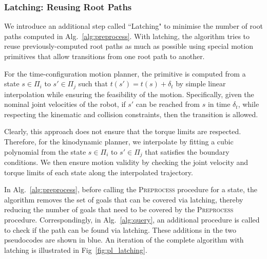 \documentclass[a4paper]{report}
\begin{document}
%

\subsubsection{Latching: Reusing Root Paths}
\label{latching}
We introduce an additional step called ``Latching" to minimise the number of root paths computed in Alg.~\ref{alg:preprocess}. With latching, the algorithm tries to reuse previously-computed root paths as much as possible using special motion primitives that allow transitions from one root path to another.

For the time-configuration motion planner, the primitive is computed from a state $s \in \Pi_i$ to $s' \in \Pi_j$ such that $t(s') = t(s) + \delta_t$ by simple linear interpolation while ensuring the feasibility of the motion. Specifically, given the nominal joint velocities of the robot, if $s'$ can be reached from $s$ in time $\delta_t$, while respecting the kinematic and collision constraints, then the transition is allowed.

Clearly, this approach does not ensure that the torque limits are respected. Therefore, for the kinodynamic planner, we interpolate by fitting a cubic polynomial from the state $s \in \Pi_i$ to $s' \in \Pi_j$ that satisfies the boundary conditions. We then ensure motion validity by checking the joint velocity and torque limits of each state along the interpolated trajectory.

In Alg.~\ref{alg:preprocess}, before calling the \textsc{Preprocess} procedure for a state, the algorithm removes the set of goals that can be covered via latching, thereby reducing the number of goals that need to be covered by the \textsc{Preprocess} procedure. Correspondingly, in Alg.~\ref{alg:query}, an additional procedure is called to check if the path can be found via latching. These additions in the two pseudocodes are shown in blue. An iteration of the complete algorithm with latching is illustrated in Fig~\ref{fig:pl_latching}.
\end{document}
